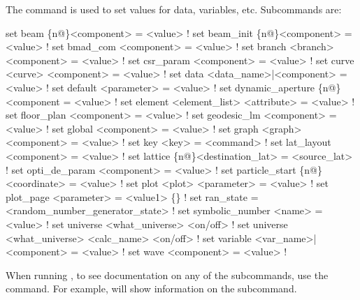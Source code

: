 {{The  command is used to set values for data, variables, etc. Subcommands are:
\begin{example}
  set beam \{n@\}<component> = <value>                        ! 
  set beam_init \{n@\}<component> = <value>                   ! 
  set bmad_com <component> = <value>                        ! 
  set branch <branch> <component> = <value>                 ! 
  set csr_param <component> = <value>                       ! 
  set curve <curve> <component> = <value>                   ! 
  set data <data_name>|<component> = <value>                ! 
  set default <parameter> = <value>                         ! 
  set dynamic_aperture \{n@\}<component = <value>             ! 
  set element <element_list> <attribute> = <value>          ! 
  set floor_plan <component> = <value>                      ! 
  set geodesic_lm <component> = <value>                     ! 
  set global <component> = <value>                          ! 
  set graph <graph> <component> = <value>                   ! 
  set key <key> = <command>                                 ! 
  set lat_layout <component> = <value>                      ! 
  set lattice \{n@\}<destination_lat> = <source_lat>          ! 
  set opti_de_param <component> = <value>                   ! 
  set particle_start \{n@\}<coordinate> = <value>             ! 
  set plot <plot> <parameter> = <value>                     ! 
  set plot_page <parameter> = <value1> \{<value2>\}           ! 
  set ran_state = <random_number_generator_state>           ! 
  set symbolic_number <name> = <value>                      ! 
  set universe <what_universe> <on/off>                     ! 
  set universe <what_universe> <calc_name> <on/off>         ! 
  set variable <var_name>|<component> = <value>             ! 
  set wave <component> = <value>                            ! 
\end{example}

\vskip 10pt 

When running \tao, to see documentation on any of the subcommands, use the  command. For example,  will show information on the  subcommand.

}}
